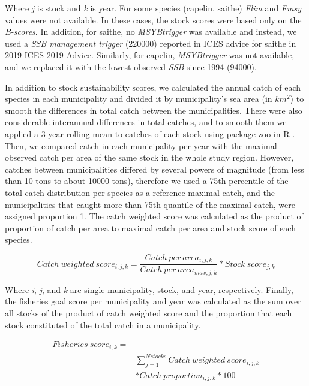 \documentclass[
]{book}
\begin{document}
Where \emph{j} is stock and \emph{k} is year.
For some species (capelin, saithe) \emph{Flim} and \emph{Fmsy} values were not available. In these cases, the stock scores were based only on the \emph{B-scores}. In addition, for saithe, no \emph{MSYBtrigger} was available and instead, we used a \emph{SSB management trigger} (220000) reported in ICES advice for saithe in 2019 \href{http://ices.dk/sites/pub/Publication\%20Reports/Advice/2019/2019/pok.27.1-2.pdf}{ICES 2019 Advice}. Similarly, for capelin, \emph{MSYBtrigger} was not available, and we replaced it with the lowest observed \emph{SSB} since 1994 (94000).

In addition to stock sustainability scores, we calculated the annual catch of each species in each municipality and divided it by municipality's sea area (in \(km^2\)) to smooth the differences in total catch between the municipalities. There were also considerable interannual differences in total catches, and to smooth them we applied a 3-year rolling mean to catches of each stock using package zoo in R \citep{zeileis2005zoo}. Then, we compared catch in each municipality per year with the maximal observed catch per area of the same stock in the whole study region. However, catches between municipalities differed by several powers of magnitude (from less than 10 tons to about 10000 tons), therefore we used a 75th percentile of the total catch distribution per species as a reference maximal catch, and the municipalities that caught more than 75th quantile of the maximal catch, were assigned proportion 1.
The catch weighted score was calculated as the product of proportion of catch per area to maximal catch per area and stock score of each species.

\begin{equation}
Catch\ weighted \ score_{i,j, k} = \frac{Catch\ per\ area_{i,j,k}}{Catch\ per\ area_{max,j,k}}*Stock\ score_{j,k}
\label{eq:catchweight} 
\end{equation}

Where \emph{i}, \emph{j}, and \emph{k} are single municipality, stock, and year, respectively.
Finally, the fisheries goal score per municipality and year was calculated as the sum over all stocks of the product of catch weighted score and the proportion that each stock constituted of the total catch in a municipality.

\begin{equation}
\begin{aligned}
 Fisheries\ score_{i,k} = \\
 & \sum_{j = 1}^{N stocks}Catch\ weighted\ score_{i,j,k}\\
 & * Catch\ proportion_{i,j,k}* 100
 \end{aligned}
  \label{eq:fishscore} 
\end{equation}
\end{document}
